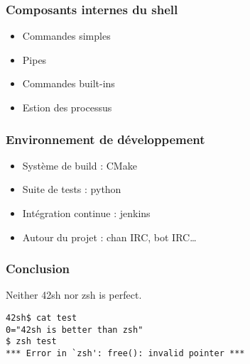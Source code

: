 \documentclass{beamer}
\begin{document}
\begin{frame}
    \frametitle{Composants internes du shell}
    \begin{itemize}
        \item Commandes simples
        \item Pipes
        \item Commandes built-ins
        \item Estion des processus
    \end{itemize}
\end{frame}

\begin{frame}
    \frametitle{Environnement de développement}
    \begin{itemize}
        \item Système de build : CMake
        \item Suite de tests : python
        \item Intégration continue : jenkins
        \item Autour du projet : chan IRC, bot IRC\dots
    \end{itemize}
\end{frame}

\begin{frame} [fragile]
    \frametitle{Conclusion}
    Neither 42sh nor zsh is perfect.
\begin{verbatim}
42sh$ cat test
0="42sh is better than zsh"
$ zsh test
*** Error in `zsh': free(): invalid pointer ***
\end{verbatim}
\end{frame}
\end{document}
